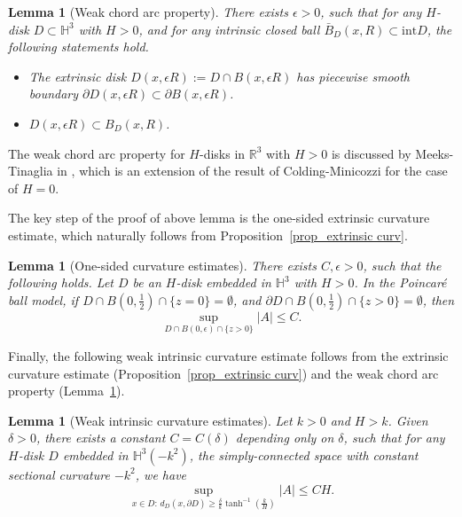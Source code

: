 \documentclass[12pt,a4paper]{amsart}
\numberwithin{equation}{section}
\theoremstyle{plain}
\newtheorem{Lemma}[Th]{Lemma}
\theoremstyle{named}
\theoremstyle{definition}
\begin{document}
\begin{Lemma}[Weak chord arc property]\label{lem_chord arc}
    There exists $\epsilon>0$, such that for any $H$-disk $D\subset \mathbb{H}^3$ with $H>0$, and for any intrinsic closed ball $\bar{B}_D(x,R)\subset \mathrm{int} D$, the following statements hold. \begin{itemize}
        \item The extrinsic disk $D(x,\epsilon R):=D\cap B(x,\epsilon R)$ has piecewise smooth boundary $\partial D(x,\epsilon R)\subset \partial B(x,\epsilon R)$.
        \item $D(x,\epsilon R)\subset B_D(x,R)$.
    \end{itemize}
\end{Lemma}
The weak chord arc property for $H$-disks in $\mathbb{R}^3$ with $H>0$ is discussed by Meeks-Tinaglia in \cite{Meeks-Tinaglia_chord_arc}, which is an extension of the result of Colding-Minicozzi \cite{Colding-Minicozzi_chord} for the case of $H=0$.

The key step of the proof of above lemma is the one-sided extrinsic curvature estimate, which naturally follows from Proposition~\ref{prop_extrinsic curv}.


\begin{Lemma}[One-sided curvature estimates]
    There exists $C,\epsilon>0$, such that the following holds. Let $D$ be an $H$-disk embedded in $\mathbb{H}^3$ with $H>0$. In the Poincar{\'e} ball model, if $D\cap B\left(0,\frac{1}{2}\right)\cap \{z=0\}=\emptyset$, and $\partial D\cap B\left(0,\frac{1}{2}\right)\cap \{z>0\}=\emptyset$, then \begin{equation*}
        \sup_{D\cap B(0,\epsilon)\cap \{z>0\}} |A|\leq C.
    \end{equation*}
\end{Lemma}


Finally, the following weak intrinsic curvature estimate follows from the extrinsic curvature estimate (Proposition~\ref{prop_extrinsic curv}) and the weak chord arc property (Lemma~\ref{lem_chord arc}). 

\begin{Lemma}[Weak intrinsic curvature estimates]\label{lem_weak_intrinsic}
    Let $k>0$ and $H>k$. Given $\delta>0$, there exists a constant $C=C(\delta)$ depending only on $\delta$, such that for any $H$-disk $D$ embedded in $\mathbb{H}^3(-k^2)$, the simply-connected space with constant sectional curvature $-k^2$, we have \begin{equation*}
        \sup_{x\in D:\, d_D(x,\partial D)\geq \frac{\delta}{k}\tanh^{-1}\left(\frac{k}{H}\right)}|A|\leq CH.
    \end{equation*}
\end{Lemma}
\end{document}

